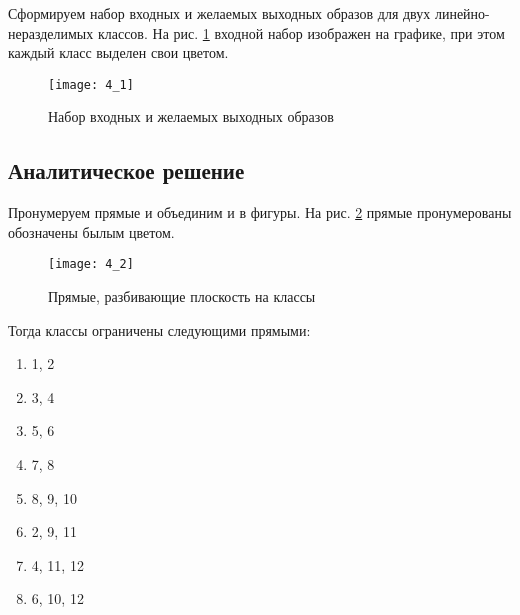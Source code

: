 Сформируем набор входных и желаемых выходных образов для двух линейно-неразделимых классов. На рис. \ref{fig:4_1} входной набор изображен на графике, при этом каждый класс выделен свои цветом.

\begin{figure}[H]
\begin{center}
	\texttt{[image: 4\_1]}
	\caption{Набор входных и желаемых выходных образов}
	\label{fig:4_1}
\end{center}
\end{figure}

\subsection{Аналитическое решение}


Пронумеруем прямые и объединим и в фигуры. На рис. \ref{fig:4_2} прямые пронумерованы обозначены былым цветом.
\begin{figure}[H]
\begin{center}
	\texttt{[image: 4\_2]}
	\caption{Прямые, разбивающие плоскость на классы}
	\label{fig:4_2}
\end{center}
\end{figure}

Тогда классы ограничены следующими прямыми:

\begin{multicols}{4}
\begin{enumerate}[label=\arabic*)]
	\item 1, 2
	\item 3, 4
	\item 5, 6
	\item 7, 8
	\item 8, 9, 10
	\item 2, 9, 11
	\item 4, 11, 12
	\item 6, 10, 12
\end{enumerate}
\end{multicols}


